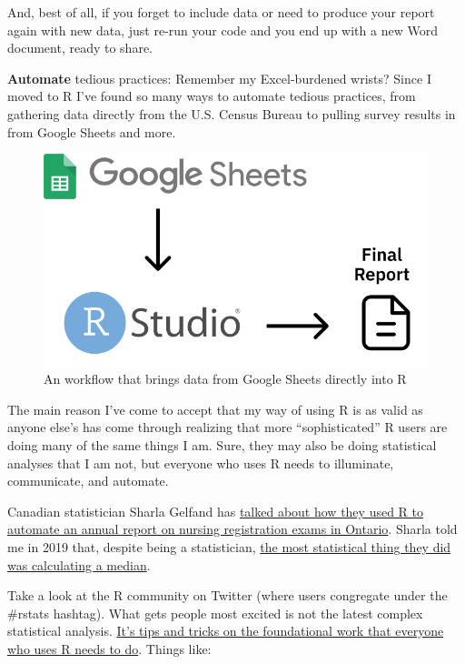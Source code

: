 \documentclass[
]{book}
\begin{document}
And, best of all, if you forget to include data or need to produce your report again with new data, just re-run your code and you end up with a new Word document, ready to share.

\textbf{Automate} tedious practices: Remember my Excel-burdened wrists? Since I moved to R I've found so many ways to automate tedious practices, from gathering data directly from the U.S. Census Bureau to pulling survey results in from Google Sheets and more.

\begin{figure}
\includegraphics[width=1\linewidth]{assets/google-sheets-workflow} \caption{An workflow that brings data from Google Sheets directly into R}\label{fig:unnamed-chunk-10}
\end{figure}

The main reason I've come to accept that my way of using R is as valid as anyone else's has come through realizing that more ``sophisticated'' R users are doing many of the same things I am. Sure, they may also be doing statistical analyses that I am not, but everyone who uses R needs to illuminate, communicate, and automate.

Canadian statistician Sharla Gelfand has \href{https://twitter.com/sharlagelfand/status/1135962094938009601}{talked about how they used R to automate an annual report on nursing registration exams in Ontario}. Sharla told me in 2019 that, despite being a statistician, \href{https://rfortherestofus.com/2019/09/my-r-journey-sharla-gelfand/}{the most statistical thing they did was calculating a median}.

Take a look at the R community on Twitter (where users congregate under the \#rstats hashtag). What gets people most excited is not the latest complex statistical analysis. \href{https://twitter.com/dgkeyes/status/1479473689225695234}{It's tips and tricks on the foundational work that everyone who uses R needs to do}. Things like:
\end{document}
